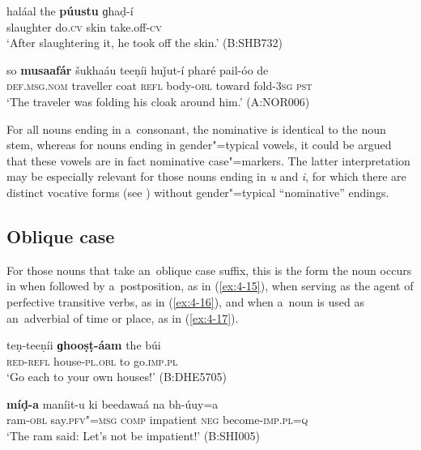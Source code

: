 \begin{exe}
\ex
\label{ex:4-14}
\gll haláal the \textbf{púustu} ɡhaḍ-í \\
	slaughter do.\textsc{cv} skin take.off-\textsc{cv} \\
\glt `After slaughtering it, he took off the skin.' (B:SHB732)
\end{exe}

\begin{exe}
\ex
\label{ex:4-14b}
\gll so \textbf{musaafár} šukhaáu teeṇíi huǰut-í pharé pail-óo de \\
	\textsc{def.msg.nom} traveller coat \textsc{refl} body-\textsc{obl} toward fold-\textsc{3sg} \textsc{pst} \\
\glt `The traveler was folding his cloak around him.' (A:NOR006)
\end{exe}


For all nouns ending in a~consonant, the nominative is identical to the noun stem, whereas for nouns ending in gender"=typical vowels, it could be argued that these vowels are in fact nominative case"=markers. The latter interpretation may be especially relevant for those nouns ending in \textit{u} and \textit{i}, for which there are distinct vocative forms (see ) without gender"=typical ``nominative'' endings.

\subsection{Oblique case}
\label{subsec:4-5-2}

For those nouns that take an~oblique case suffix, this is the form the noun occurs in when followed by a~postposition, as in (\ref{ex:4-15}), when serving as the agent of perfective transitive verbs, as in (\ref{ex:4-16}), and when a~noun is used as an~adverbial of time or place, as in (\ref{ex:4-17}). 


\begin{exe}
\ex
\label{ex:4-15}
\gll teṇ-teeṇíi \textbf{ɡhooṣṭ-áam} the búi\\
	\textsc{red}-\textsc{refl} house-\textsc{pl.obl} to go.\textsc{imp.pl} \\
\glt `Go each to your own houses!' (B:DHE5705)
\end{exe}

\begin{exe}
\ex
\label{ex:4-16}
\gll \textbf{míḍ-a} maníit-u ki beedawaá na bh-úuy=a \\
	ram-\textsc{obl} say.\textsc{pfv"=msg} \textsc{comp} impatient \textsc{neg} become-\textsc{imp.pl=q} \\
\glt `The ram said: Let's not be impatient!' (B:SHI005)
\end{exe}

